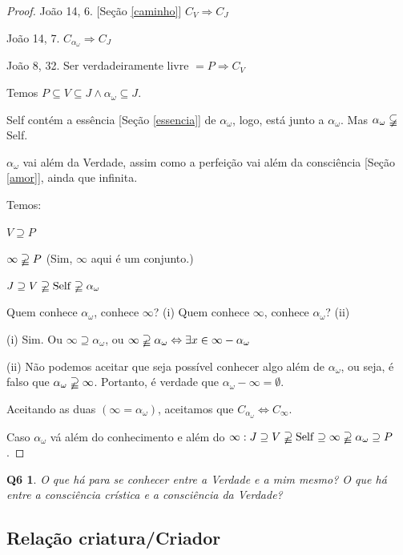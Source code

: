 \documentclass[12pt,a4paper]{article}
\begin{document}
			\begin{proof}
			Jo\~ao 14, 6. [Se\c{c}\~ao \ref{caminho}] $C_V \Rightarrow C_J $

			Jo\~ao\cite{unidade} 14, 7. $C_{\alpha_\omega} \Rightarrow C_J $

			Jo\~ao\cite{verdade} 8, 32. Ser verdadeiramente livre $ = P \Rightarrow C_V $

			Temos $ P \subseteq V \subseteq J \wedge \alpha_\omega \subseteq J$.

			Self cont\'em a ess\^encia [Se\c{c}\~ao \ref{essencia}] de $\alpha_\omega$, logo, est\'a junto a $\alpha_\omega$. Mas $\alpha_\omega \varsubsetneqq $ Self.

			$ \alpha_\omega $ vai al\'em da Verdade, assim como a perfei\c{c}\~ao vai al\'em da consci\^encia [Se\c{c}\~ao \ref{amor}], ainda que infinita.

			Temos:

			$ V \supseteq P $

			$ \infty \varsupsetneqq P $ (Sim, $ \infty $ aqui \'e um conjunto.)

			$ J \supseteq V \varsupsetneqq \mathrm{Self} \varsupsetneqq \alpha_\omega $

			Quem conhece $ \alpha_\omega $, conhece $ \infty $? (i) Quem conhece $ \infty $, conhece $ \alpha_\omega $? (ii)

			(i) Sim. Ou $ \infty \supseteq \alpha_\omega $, ou $ \infty \varsupsetneqq \alpha_\omega \Leftrightarrow \exists x \in \infty - \alpha_\omega $

			(ii) N\~ao podemos aceitar que seja poss\'ivel conhecer algo al\'em de $ \alpha_\omega $, ou seja, \'e falso que $ \alpha_\omega \varsupsetneqq \infty $. Portanto, \'e verdade que $ \alpha_\omega - \infty = \emptyset $.

			Aceitando as duas $(\infty = \alpha_\omega)$, aceitamos que $C_{\alpha_\omega} \Leftrightarrow C_\infty $.

			Caso $ \alpha_\omega $ v\'a al\'em do conhecimento e al\'em do $ \infty: J \supseteq V \varsupsetneqq \mathrm{Self} \supseteq \infty \varsupsetneqq \alpha_\omega \supseteq P$.
			\end{proof}

			\newtheorem{Q6}{Q6}
			\begin{Q6} O que h\'a para se conhecer entre a Verdade e a mim mesmo? O que h\'a entre a consci\^encia cr\'istica e a consci\^encia da Verdade?
			\end{Q6}

		\subsection{Rela\c{c}\~ao criatura/Criador}\label{criaturaCriador}
			\begin{flushright}
			\end{flushright}
\end{document}

